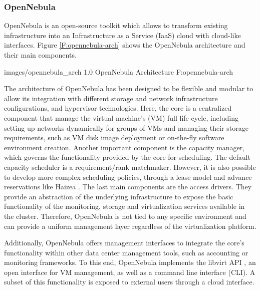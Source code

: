 
\subsubsection{OpenNebula}

OpenNebula \cite{www/opennebula, llorentecloud} is an open-source toolkit which allows to transform existing infrastructure into an Infrastructure as a Service (IaaS) cloud with cloud-like interfaces. Figure \ref{F:opennebula-arch} shows the OpenNebula architecture and their main components.

  {images/opennebula_arch}
  {1.0}
  {OpenNebula Architecture}
  {F:opennebula-arch}

The architecture of OpenNebula has been designed to be flexible and modular to allow its integration with different storage and network infrastructure configurations, and hypervisor technologies. Here, the core is a centralized component that manage the virtual machine's (VM) full life cycle, including setting up networks dynamically for groups of VMs and managing their storage requirements, such as VM disk image deployment or on-the-fly software environment creation. Another important component is the capacity manager, which governs the functionality provided by the core for scheduling. The default capacity scheduler is a requirement/rank matchmaker. However, it is also possible to develop more complex scheduling policies, through a lease model and advance reservations like Haizea \cite{haizea}. The last main components are the access drivers. They provide an abstraction of the underlying infrastructure to expose the basic functionality of the monitoring, storage and virtualization services available in the cluster. Therefore, OpenNebula is not tied to any specific environment and can provide a uniform management layer regardless of the virtualization platform.

Additionally, OpenNebula offers management interfaces to integrate the core's functionality within other data center management tools, such as accounting or monitoring frameworks. To this end, OpenNebula implements the libvirt API \cite{www/libvirt}, an open interface for VM management, as well as a command line interface (CLI). A subset of this functionality is exposed to external users through a cloud interface.

